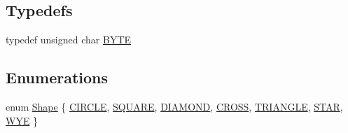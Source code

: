\subsection*{Typedefs}
\begin{DoxyCompactItemize}
\item 
typedef unsigned char \mbox{\hyperlink{namespacebridges_a59b77ee45243ba85c701fb8ab298ef00}{B\+Y\+TE}}
\end{DoxyCompactItemize}
\subsection*{Enumerations}
\begin{DoxyCompactItemize}
\item 
enum \mbox{\hyperlink{namespacebridges_a1b4050586bd708782ae0d4f3b06b9579}{Shape}} \{ \newline
\mbox{\hyperlink{namespacebridges_a1b4050586bd708782ae0d4f3b06b9579aa968bf0f7aeccbae1a40751345bf2e64}{C\+I\+R\+C\+LE}}, 
\mbox{\hyperlink{namespacebridges_a1b4050586bd708782ae0d4f3b06b9579a4fc84095f1e7f3e664913b93050196e2}{S\+Q\+U\+A\+RE}}, 
\mbox{\hyperlink{namespacebridges_a1b4050586bd708782ae0d4f3b06b9579aefd26c044477c7b165bc744110e0ee93}{D\+I\+A\+M\+O\+ND}}, 
\mbox{\hyperlink{namespacebridges_a1b4050586bd708782ae0d4f3b06b9579abe7bf91f3fc0356925109d7afdd43135}{C\+R\+O\+SS}}, 
\newline
\mbox{\hyperlink{namespacebridges_a1b4050586bd708782ae0d4f3b06b9579aefa847fb39a9ebeb68a522b94f5efeb0}{T\+R\+I\+A\+N\+G\+LE}}, 
\mbox{\hyperlink{namespacebridges_a1b4050586bd708782ae0d4f3b06b9579a17166ae3c0c2333bf74313d74e539e3e}{S\+T\+AR}}, 
\mbox{\hyperlink{namespacebridges_a1b4050586bd708782ae0d4f3b06b9579af88d2180d4c2ee55a1d963959c345047}{W\+YE}}
 \}
\end{DoxyCompactItemize}

